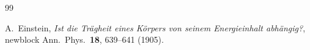 \documentclass[11pt]{article}
\begin{document}
        
        \begin{thebibliography}{99}

             A.~Einstein, \newblock \emph{Ist die Tr\"agheit eines K\"orpers von seinem Energieinhalt
            abh\"angig?}, newblock Ann.\ Phys.\ \textbf{18}, 639--641 (1905).

        \end{thebibliography}
\end{document}
